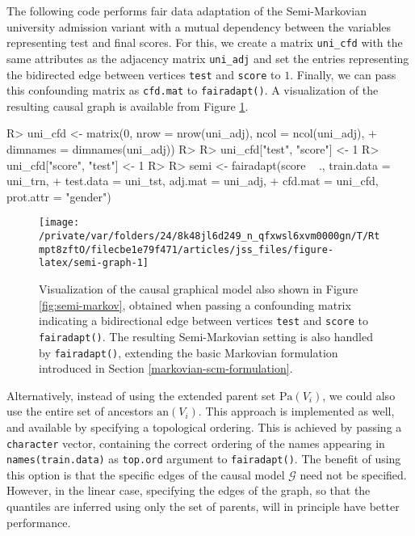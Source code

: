 \documentclass[
  nojss]{jss}
\begin{document}
The following code performs fair data adaptation of the Semi-Markovian
university admission variant with a mutual dependency between the
variables representing test and final scores. For this, we create a
matrix \texttt{uni\_cfd} with the same attributes as the adjacency
matrix \texttt{uni\_adj} and set the entries representing the bidirected
edge between vertices \texttt{test} and \texttt{score} to \(1\).
Finally, we can pass this confounding matrix as \texttt{cfd.mat} to
\texttt{fairadapt()}. A visualization of the resulting causal graph is
available from Figure \ref{fig:semi-graph}.

\begin{CodeChunk}
\begin{CodeInput}
R> uni_cfd <- matrix(0, nrow = nrow(uni_adj), ncol = ncol(uni_adj),
+                   dimnames = dimnames(uni_adj))
R> 
R> uni_cfd["test", "score"] <- 1
R> uni_cfd["score", "test"] <- 1
R> 
R> semi <- fairadapt(score ~ ., train.data = uni_trn,
+                   test.data = uni_tst, adj.mat = uni_adj,
+                   cfd.mat = uni_cfd, prot.attr = "gender")
\end{CodeInput}
\end{CodeChunk}

\begin{CodeChunk}
\begin{figure}

{\centering \texttt{[image: /private/var/folders/24/8k48jl6d249\_n\_qfxwsl6xvm0000gn/T/Rtmpt8zftO/filecbe1e79f471/articles/jss\_files/figure-latex/semi-graph-1]} 

}

\caption{Visualization of the causal graphical model also shown in Figure \ref{fig:semi-markov}, obtained when passing a confounding matrix indicating a bidirectional edge between vertices \texttt{test} and \texttt{score} to \texttt{fairadapt()}. The resulting Semi-Markovian setting is also handled by \texttt{fairadapt()}, extending the basic Markovian formulation introduced in Section \ref{markovian-scm-formulation}.}\label{fig:semi-graph}
\end{figure}
\end{CodeChunk}

Alternatively, instead of using the extended parent set
\(\mathrm{Pa}(V_i)\), we could also use the entire set of ancestors
\(\mathrm{an}(V_i)\). This approach is implemented as well, and
available by specifying a topological ordering. This is achieved by
passing a \texttt{character} vector, containing the correct ordering of
the names appearing in \texttt{names(train.data)} as \texttt{top.ord}
argument to \texttt{fairadapt()}. The benefit of using this option is
that the specific edges of the causal model \(\mathcal{G}\) need not be
specified. However, in the linear case, specifying the edges of the
graph, so that the quantiles are inferred using only the set of parents,
will in principle have better performance.
\end{document}
